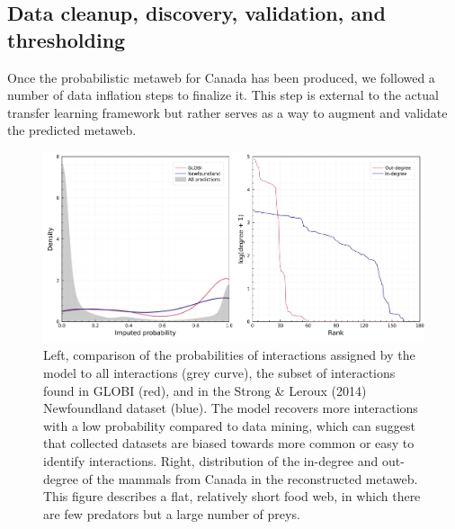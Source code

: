 \documentclass[11pt]{article}
\makeatletter
\def\maxwidth{\ifdim\Gin@nat@width>\linewidth\linewidth
\else\Gin@nat@width\fi}
\let\Oldincludegraphics\includegraphics
\renewcommand{\includegraphics}[1]{\Oldincludegraphics[width=\maxwidth]{#1}}
\providecommand{\DIFaddend}{\protect\color{black}} %
\providecommand{\DIFaddbeginFL}{} %
\providecommand{\DIFaddendFL}{} %
\providecommand{\DIFdelbeginFL}{} %
\providecommand{\DIFdelendFL}{} %
\newcommand{\DIFscaledelfig}{0.5}
\newlength{\DIFdelgraphicswidth} %
\newlength{\DIFdelgraphicsheight} %
\newcommand{\DIFaddincludegraphics}[2][]{{\color{blue}\fbox{\DIFOincludegraphics[#1]{#2}}}} %
\newcommand{\DIFdelincludegraphics}[2][]{%
\sbox{\DIFdelgraphicsbox}{\DIFOincludegraphics[#1]{#2}}%
\settoboxwidth{\DIFdelgraphicswidth}{\DIFdelgraphicsbox} %
\settoboxtotalheight{\DIFdelgraphicsheight}{\DIFdelgraphicsbox} %
\scalebox{\DIFscaledelfig}{%
\parbox[b]{\DIFdelgraphicswidth}{\usebox{\DIFdelgraphicsbox}\\[-\baselineskip] \rule{\DIFdelgraphicswidth}{0em}}\llap{\resizebox{\DIFdelgraphicswidth}{\DIFdelgraphicsheight}{%
\setlength{\unitlength}{\DIFdelgraphicswidth}%
\begin{picture}(1,1)%
\thicklines\linethickness{2pt} %
{\color[rgb]{1,0,0}\put(0,0){\framebox(1,1){}}}%
{\color[rgb]{1,0,0}\put(0,0){\line( 1,1){1}}}%
{\color[rgb]{1,0,0}\put(0,1){\line(1,-1){1}}}%
\end{picture}%
}\hspace*{3pt}}} %
} %
\DeclareRobustCommand{\DIFaddend}{\DIFOaddend \let\includegraphics\DIFOincludegraphics} %
\DeclareRobustCommand{\DIFaddbeginFL}{\DIFOaddbeginFL \let\includegraphics\DIFaddincludegraphics} %
\DeclareRobustCommand{\DIFaddendFL}{\DIFOaddendFL \let\includegraphics\DIFOincludegraphics} %
\DeclareRobustCommand{\DIFdelbeginFL}{\DIFOdelbeginFL \let\includegraphics\DIFdelincludegraphics} %
\DeclareRobustCommand{\DIFdelendFL}{\DIFOaddendFL \let\includegraphics\DIFOincludegraphics} %
\makeatother
\begin{document}
\DIFaddend \hypertarget{data-cleanup-discovery-validation-and-thresholding}{%
\subsection{Data cleanup, discovery, validation, and
thresholding}\label{data-cleanup-discovery-validation-and-thresholding}}

Once the probabilistic metaweb for Canada has been produced, we followed
a number of data inflation steps to finalize it. This step is external
to the actual transfer learning framework but rather serves as a way to
augment and validate the predicted metaweb.

\begin{figure}
\DIFdelbeginFL %
\DIFdelendFL \DIFaddbeginFL \hypertarget{fig:inflation}{%
\centering
\includegraphics{figures/figure-validation.png}
\caption{Left, comparison of the probabilities of interactions assigned
by the model to all interactions (grey curve), the subset of
interactions found in GLOBI (red), and in the Strong \& Leroux (2014)
Newfoundland dataset (blue). The model recovers more interactions with a
low probability compared to data mining, which can suggest that
collected datasets are biased towards more common or easy to identify
interactions. Right, distribution of the in-degree and out-degree of the
mammals from Canada in the reconstructed metaweb. This figure describes
a flat, relatively short food web, in which there are few predators but
a large number of preys.}\label{fig:inflation}
}
\DIFaddendFL \end{figure}
\end{document}
